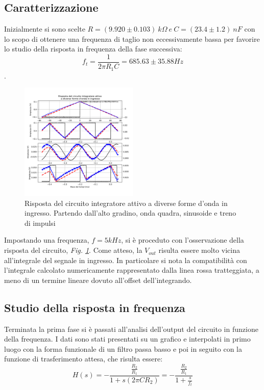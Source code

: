 \documentclass[journal]{IEEEtran}
\begin{document}
\subsection{\textbf{Caratterizzazione}}
Inizialmente si sono scelte $R = (9.920 \pm 0.103) \ k\Omega \ e \ C = (23.4 \pm 1.2) \ nF$ con lo scopo di ottenere una frequenza di taglio non eccessivamente bassa per favorire lo studio della risposta in frequenza della fase successiva: \[f_{t} = \frac{1}{2 \pi R_{1} C}= 685.63 \pm 35.88 Hz\].

\begin{figure}[H]%
\begin {center}
\includegraphics[width=0.50\textwidth]{analysis/output/OPA-integ-with-res.pdf}
\caption{Risposta del circuito integratore attivo a diverse forme d'onda in ingresso. Partendo dall'alto gradino, onda quadra, sinusoide e treno di impulsi}
\label{fig:OPA-integ-res}
\end {center}
\end{figure}
Impostando una frequenza, $f= 5 kHz$, si è proceduto con l'osservazione della risposta del circuito, \textit{Fig. \ref{fig:OPA-integ-res}}. Come atteso, la $V_{out}$ risulta essere molto vicina all'integrale del segnale in ingresso. In particolare si nota la compatibilità con l'integrale calcolato numericamente rappresentato dalla linea rossa tratteggiata, a meno di un termine lineare dovuto all'offset dell'integrando.

\subsection{\textbf{Studio della risposta in frequenza}}

Terminata la prima fase si è passati all'analisi dell'output del circuito in funzione della frequenza. I dati sono stati presentati su un grafico e interpolati in primo luogo con la forma funzionale di un filtro passa basso e poi in seguito con la funzione di trasferimento attesa, che risulta essere: 
\begin{equation}
    H(s) = -\frac{\frac{R_2}{R_1}}{1 + s(2 \pi C R_2)} = -\frac{\frac{R_2}{R_1}}{1 + \frac{s}{f_t}}
\end{equation}
\end{document}
